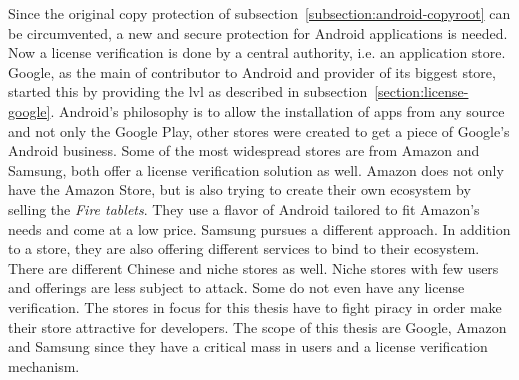 Since the original copy protection of subsection~\ref{subsection:android-copyroot} can be circumvented, a new and secure protection for Android applications is needed.
Now a license verification is done by a central authority, i.e. an application store.
Google, as the main of contributor to Android and provider of its biggest store, started this by providing the \gls{lvl} as described in subsection~\ref{section:license-google}.
\newline
Android’s philosophy is to allow the installation of apps from any source and not only the Google Play, other stores were created to get a piece of Google's Android business.
Some of the most widespread stores are from Amazon and Samsung, both offer a license verification solution as well.
\newline
Amazon does not only have the Amazon Store, but is also trying to create their own ecosystem by selling the \textit{Fire tablets}.
They use a flavor of Android tailored to fit Amazon's needs and come at a low price.
\newline
Samsung pursues a different approach.
In addition to a store, they are also offering different services to bind to their ecosystem.
There are different Chinese and niche stores as well.
Niche stores with few users and offerings are less subject to attack.
Some do not even have any license verification.
\newline
The stores in focus for this thesis have to fight piracy in order make their store attractive for developers.
\newline
\newline
The scope of this thesis are Google, Amazon and Samsung since they have a critical mass in users and a license verification mechanism.

